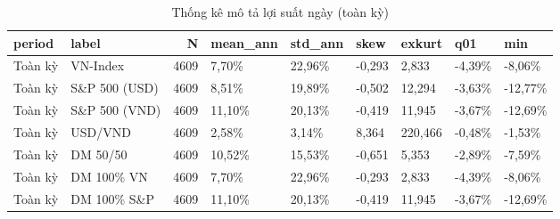 \begin{table}
\caption{Thống kê mô tả lợi suất ngày (toàn kỳ)}
\label{tab:T1_descriptive}
\begin{tabular}{llrllllll}
\toprule
period & label & N & mean\_ann & std\_ann & skew & exkurt & q01 & min \\
\midrule
Toàn kỳ & VN-Index & 4609 & 7,70\% & 22,96\% & -0,293 & 2,833 & -4,39\% & -8,06\% \\
Toàn kỳ & S\&P 500 (USD) & 4609 & 8,51\% & 19,89\% & -0,502 & 12,294 & -3,63\% & -12,77\% \\
Toàn kỳ & S\&P 500 (VND) & 4609 & 11,10\% & 20,13\% & -0,419 & 11,945 & -3,67\% & -12,69\% \\
Toàn kỳ & USD/VND & 4609 & 2,58\% & 3,14\% & 8,364 & 220,466 & -0,48\% & -1,53\% \\
Toàn kỳ & DM 50/50 & 4609 & 10,52\% & 15,53\% & -0,651 & 5,353 & -2,89\% & -7,59\% \\
Toàn kỳ & DM 100\% VN & 4609 & 7,70\% & 22,96\% & -0,293 & 2,833 & -4,39\% & -8,06\% \\
Toàn kỳ & DM 100\% S\&P & 4609 & 11,10\% & 20,13\% & -0,419 & 11,945 & -3,67\% & -12,69\% \\
\bottomrule
\end{tabular}
\end{table}
